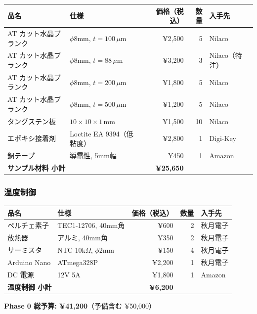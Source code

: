 \begin{center}
\small
\begin{tabular}{llrrl}
\toprule
品名 & 仕様 & 価格（税込） & 数量 & 入手先 \\
\midrule
AT カット水晶ブランク & $\phi$8mm, $t=100\,\mu$m & ¥2,500 & 5 & Nilaco \\
AT カット水晶ブランク & $\phi$8mm, $t=88\,\mu$m & ¥3,200 & 3 & Nilaco（特注）\\
AT カット水晶ブランク & $\phi$8mm, $t=200\,\mu$m & ¥1,800 & 5 & Nilaco \\
AT カット水晶ブランク & $\phi$8mm, $t=500\,\mu$m & ¥1,200 & 5 & Nilaco \\
タングステン板 & $10\times10\times1$\,mm & ¥1,500 & 10 & Nilaco \\
エポキシ接着剤 & Loctite EA 9394（低粘度）& ¥2,800 & 1 & Digi-Key \\
銅テープ & 導電性, 5mm幅 & ¥450 & 1 & Amazon \\
\midrule
\multicolumn{2}{l}{\textbf{サンプル材料 小計}} & \textbf{¥25,650} & & \\
\bottomrule
\end{tabular}
\end{center}

\subsubsection{温度制御}

\begin{center}
\small
\begin{tabular}{llrrl}
\toprule
品名 & 仕様 & 価格（税込） & 数量 & 入手先 \\
\midrule
ペルチェ素子 & TEC1-12706, 40mm角 & ¥600 & 2 & 秋月電子 \\
放熱器 & アルミ, 40mm角 & ¥350 & 2 & 秋月電子 \\
サーミスタ & NTC 10k$\Omega$, $\phi$2mm & ¥150 & 4 & 秋月電子 \\
Arduino Nano & ATmega328P & ¥2,200 & 1 & 秋月電子 \\
DC 電源 & 12V 5A & ¥1,800 & 1 & Amazon \\
\midrule
\multicolumn{2}{l}{\textbf{温度制御 小計}} & \textbf{¥6,200} & & \\
\bottomrule
\end{tabular}
\end{center}

\begin{center}
\large
\textbf{Phase 0 総予算: ¥41,200}（予備含む ¥50,000）
\end{center}

